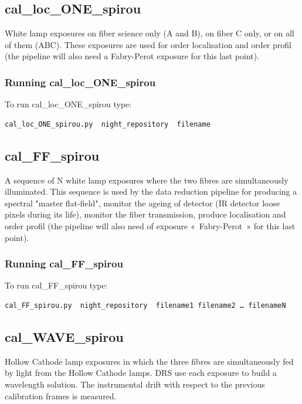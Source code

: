 \subsection{cal\_loc\_ONE\_spirou}

White lamp exposures on fiber science only (A and B), on fiber C only, or on all of them (ABC). These exposures are used for order localisation and order profil (the pipeline will also need a Fabry-Perot exposure for this last point).

\subsubsection{Running cal\_loc\_ONE\_spirou}

To run cal\_loc\_ONE\_spirou type:
\begin{lstlisting}[language=bash, style=bashstyle]
cal_loc_ONE_spirou.py  night_repository  filename
\end{lstlisting}


\subsection{cal\_FF\_spirou}

A sequence of N white lamp exposures where the two fibres are simultaneously illuminated. This sequence is used by the data reduction pipeline for producing a spectral "master flat-field", monitor the ageing of detector (IR detector loose pixels during its life), monitor the fiber transmission, produce localisation and order profil (the pipeline will also need of exposure « Fabry-Perot » for this last point).

\subsubsection{Running cal\_FF\_spirou}

To run cal\_FF\_spirou type:
\begin{lstlisting}[language=bash, style=bashstyle]
cal_FF_spirou.py  night_repository  filename1 filename2 … filenameN
\end{lstlisting}


\subsection{cal\_WAVE\_spirou}

Hollow Cathode lamp exposures in which the three fibres are simultaneously fed by light from the Hollow Cathode lamps. DRS use each exposure to build a wavelength solution. The instrumental drift with respect to the previous calibration frames is measured.

